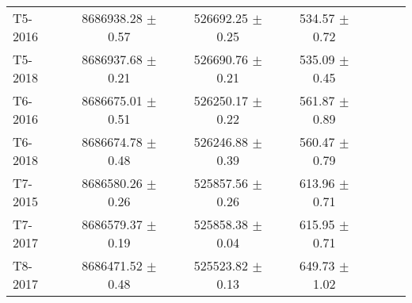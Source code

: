 \begin{tabular}{lcccccc}
     T5-2016 &  8686938.28 $\pm$ 0.57 &  526692.25 $\pm$ 0.25 &  534.57 $\pm$ 0.72 \\
     T5-2018 &  8686937.68 $\pm$ 0.21 &  526690.76 $\pm$ 0.21 &  535.09 $\pm$ 0.45 \\
     T6-2016 &  8686675.01 $\pm$ 0.51 &  526250.17 $\pm$ 0.22 &  561.87 $\pm$ 0.89 \\
     T6-2018 &  8686674.78 $\pm$ 0.48 &  526246.88 $\pm$ 0.39 &  560.47 $\pm$ 0.79 \\
     T7-2015 &  8686580.26 $\pm$ 0.26 &  525857.56 $\pm$ 0.26 &  613.96 $\pm$ 0.71 \\
     T7-2017 &  8686579.37 $\pm$ 0.19 &  525858.38 $\pm$ 0.04 &  615.95 $\pm$ 0.71 \\
     T8-2017 &  8686471.52 $\pm$ 0.48 &  525523.82 $\pm$ 0.13 &  649.73 $\pm$ 1.02 \\
\bottomrule
\end{tabular}
